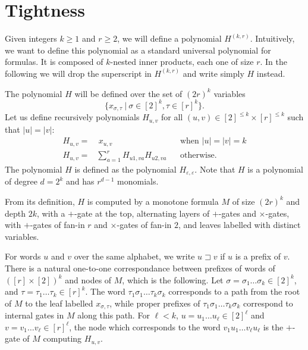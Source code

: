 \documentclass[11pt,a4paper]{article}
\newcommand{\prefix}{\sqsupset}
\newcommand{\comment}[2]{\marginpar{\tiny{\textbf{#1: }\textit{#2}}}}
\newcommand{\hf}[1]{\comment{HF}{#1}}
\begin{document}
\section{Tightness}

\label{sec:tightness}


Given integers $k \geq 1$ and $r \geq 2$, we will define a polynomial $H^{(k,r)}$.
Intuitively, we want to define this polynomial as a standard universal polynomial for formulas. It is composed of \(k\)-nested inner products, each one of size \(r\).
In the following we will drop the superscript in $H^{(k,r)}$ and write simply $H$ instead.

The polynomial $H$ will be defined over the set of
$(2r)^k$  variables
$$\{x_{\sigma,\tau}\ |\ \sigma\in [2]^k, \tau \in [r]^{k}\}.$$
Let us define recursively polynomials $H_{u,v}$ for all $(u,v) \in [2]^{\leq k} \times [r]^{\leq k}$ such that $|u|=|v|$:
\begin{align*}
	H_{u,v} = & \ x_{u,v} 	&& \text{when }|u|=|v|=k\\
	H_{u,v} = & \sum_{a=1}^{r} H_{u 1,v a} H_{u 2, v a} && \text{otherwise}.
\end{align*}
The polynomial $H$ is defined as the polynomial \(H_{\varepsilon,\varepsilon}\).
Note that $H$ is a polynomial of degree $d=2^k$ and has $r^{d-1}$ monomials.

From its definition, $H$ is computed by a monotone formula $M$
of size $(2r)^k$
and depth $2k$,
with a $+$-gate at the top, alternating layers of $+$-gates and $\times$-gates, with $+$-gates of fan-in $r$
and $\times$-gates of fan-in $2$, and leaves labelled with distinct variables.

For words $u$ and $v$ over the same alphabet, we write $u \prefix v$ if $u$ is a prefix of $v$.
There is a natural one-to-one correspondance between prefixes of words of $([r]\times[2])^k$
and nodes of $M$, which is the following.
Let $\sigma = \sigma_1 \ldots \sigma_k \in [2]^k$, and $\tau = \tau_1 \ldots \tau_{k} \in [r]^{k}$.
The word $\tau_1 \sigma_1 \ldots \tau_k \sigma_k$ corresponds to a path from the root of $M$
to the leaf labelled $x_{\sigma,\tau}$, while proper prefixes of $\tau_1 \sigma_1 \ldots \tau_k \sigma_k$
correspond to internal gates in $M$ along this path.
For $\ell < k$, $u=u_1\ldots u_\ell \in [2]^\ell$ and $v=v_1 \ldots v_\ell \in [r]^\ell$,
the node which corresponds to the word $v_1 u_1 \ldots v_\ell u_\ell$ is the $+$-gate of $M$ computing $H_{u,v}$.
\end{document}

